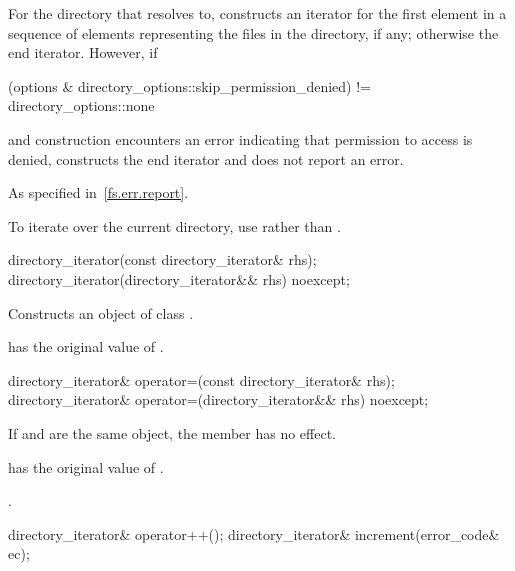 \begin{itemdescr}
\pnum
\effects For the directory that  resolves to, constructs an
iterator for the first element in a sequence of 
elements representing the files in the directory, if any; otherwise the end
iterator. However, if
\begin{codeblock}
(options & directory_options::skip_permission_denied) != directory_options::none
\end{codeblock}
and construction encounters an error indicating
that permission to access  is denied, constructs the end iterator
and does not report an error.

\pnum
\throws As specified in~\ref{fs.err.report}.

\pnum
\begin{note} To iterate over the current directory, use  rather than . \end{note}
\end{itemdescr}

%
\begin{itemdecl}
directory_iterator(const directory_iterator& rhs);
directory_iterator(directory_iterator&& rhs) noexcept;
\end{itemdecl}

\begin{itemdescr}
\pnum
\effects Constructs an object of class .

\pnum
\ensures {} has the original value of .
\end{itemdescr}

%
\begin{itemdecl}
directory_iterator& operator=(const directory_iterator& rhs);
directory_iterator& operator=(directory_iterator&& rhs) noexcept;
\end{itemdecl}

\begin{itemdescr}
\pnum
\effects If  and  are the same
  object, the member has no effect.

\pnum
\ensures {} has the original value of .

\pnum
\returns {}.
\end{itemdescr}

%
%
\begin{itemdecl}
directory_iterator& operator++();
directory_iterator& increment(error_code& ec);
\end{itemdecl}

